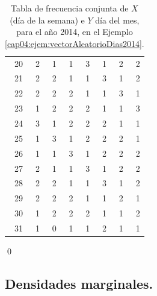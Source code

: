 \begin{ejemplo}
\begin{table}[p]
\begin{tabular}{|r|r|r|r|r|r|r|r|}
  20 &   2 &   1 &   1 &   3 &   1 &   2 &   2 \\
  21 &   2 &   2 &   1 &   1 &   3 &   1 &   2 \\
  22 &   2 &   2 &   2 &   1 &   1 &   3 &   1 \\
  23 &   1 &   2 &   2 &   2 &   1 &   1 &   3 \\
  24 &   3 &   1 &   2 &   2 &   2 &   1 &   1 \\
  25 &   1 &   3 &   1 &   2 &   2 &   2 &   1 \\
  26 &   1 &   1 &   3 &   1 &   2 &   2 &   2 \\
  27 &   2 &   1 &   1 &   3 &   1 &   2 &   2 \\
  28 &   2 &   2 &   1 &   1 &   3 &   1 &   2 \\
  29 &   2 &   2 &   2 &   1 &   1 &   2 &   1 \\
  30 &   1 &   2 &   2 &   2 &   1 &   1 &   2 \\
  31 &   1 &   0 &   1 &   1 &   2 &   1 &   1 \\
   \hline
\end{tabular}
\caption{Tabla de frecuencia conjunta de $X$ (día de la semana) e $Y$ día del mes, para el año 2014, en el Ejemplo \ref{cap04:ejem:vectorAleatorioDias2014}.}
\label{cap04:tabla:vectorAleatorioDias2014}
\end{table}
\qed
\end{ejemplo}


\subsection{Densidades marginales.}
\label{cap04:subsec:DendidadesMarginales}

